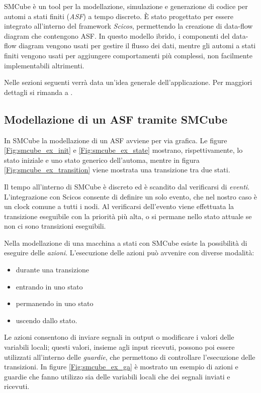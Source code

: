 SMCube\cite{smcube} è un tool per la modellazione, simulazione e generazione di codice per automi a stati finiti (\textsl{ASF}) a tempo discreto. È stato progettato per essere integrato all'interno del framework \textit{Scicos}\cite{scicos}, permettendo la creazione di data-flow diagram che contengono ASF. In questo modello ibrido, i componenti del data-flow diagram vengono usati per gestire il flusso dei dati, mentre gli automi a stati finiti vengono usati per aggiungere comportamenti più complessi, non facilmente implementabili altrimenti.

Nelle sezioni seguenti verrà data un'idea generale dell'applicazione. Per maggiori dettagli si rimanda a \cite{smcube_man}.

\subsection{Modellazione di un ASF tramite SMCube}
In SMCube la modellazione di un ASF avviene per via grafica. Le figure \ref{Fig:smcube_ex_init} e \ref{Fig:smcube_ex_state} mostrano, rispettivamente, lo stato iniziale e uno stato generico dell'automa, mentre in figura \ref{Fig:smcube_ex_transition} viene mostrata una transizione tra due stati.

Il tempo all'interno di SMCube è discreto ed è scandito dal verificarsi di \textsl{eventi}. L'integrazione con Scicos consente di definire un solo evento, che nel nostro caso è un clock comune a tutti i nodi. Al verificarsi dell'evento viene effettuata la transizione eseguibile con la priorità più alta, o si permane nello stato attuale se non ci sono transizioni eseguibili.

Nella modellazione di una macchina a stati con SMCube esiste la possibilità di eseguire delle \textsl{azioni}. L'esecuzione delle azioni può avvenire con diverse modalità:

\begin{itemize}
\item durante una transizione
\item entrando in uno stato
\item permanendo in uno stato
\item uscendo dallo stato.
\end{itemize}

Le azioni consentono di inviare segnali in output o modificare i valori delle variabili locali; questi valori, insieme agli input ricevuti, possono poi essere utilizzati all'interno delle \textsl{guardie}, che permettono di controllare l'esecuzione delle transizioni. In figure \ref{Fig:smcube_ex_ga} è mostrato un esempio di azioni e guardie che fanno utilizzo sia delle variabili locali che dei segnali inviati e ricevuti.

